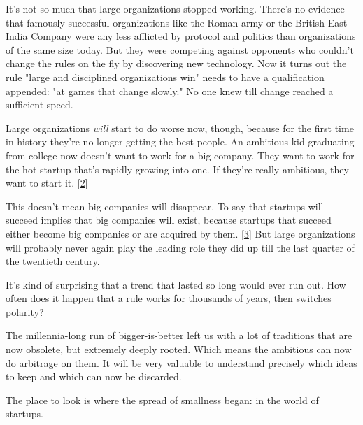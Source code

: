 It's not so much that large
                  organizations stopped working. There's no evidence that
                  famously successful organizations like the Roman army or the
                  British East India Company were any less afflicted by protocol
                  and politics than organizations of the same size today. But
                  they were competing against opponents who couldn't change the
                  rules on the fly by discovering new technology. Now it turns
                  out the rule "large and disciplined organizations win" needs
                  to have a qualification appended: "at games that change
                  slowly." No one knew till change reached a sufficient
                  speed.

Large organizations \emph{will} start to do
                  worse now, though, because for the first time in history
                  they're no longer getting the best people. An ambitious kid
                  graduating from college now doesn't want to work for a big
                  company. They want to work for the hot startup that's rapidly
                  growing into one. If they're really ambitious, they want to
                  start it.
                  [\href{\#f2n}{2}]

This doesn't mean big companies will disappear.
                  To say that startups will succeed implies that big companies
                  will exist, because startups that succeed either become big
                  companies or are acquired by them.
                  [\href{\#f3n}{3}]
                  But large organizations will probably never again play the
                  leading role they did up till the last quarter of the
                  twentieth century.

It's kind of surprising that a
                  trend that lasted so long would ever run out. How often does
                  it happen that a rule works for thousands of years, then
                  switches polarity?

The millennia-long run of
                  bigger-is-better left us with a lot of
                  \href{http://www.paulgraham.com/credentials.html}{traditions} that are now
                  obsolete, but extremely deeply rooted. Which means the
                  ambitious can now do arbitrage on them. It will be very
                  valuable to understand precisely which ideas to keep and which
                  can now be discarded.

The place to look is where
                  the spread of smallness began: in the world of startups.

